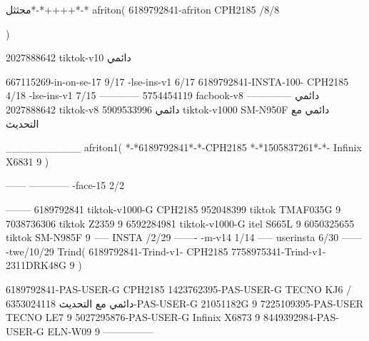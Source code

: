 مجثثل*-*++++*-*
afriton(
6189792841-afriton CPH2185  /8/8

)

2027888642 tiktok-v10
دائمي

667115269-in-on-se-17 9/17
-lse-ins-v1 6/17
6189792841-INSTA-100- CPH2185 4/18
-lse-ins-v1 7/15
------------
5754454119 facbook-v8
دائمي
--------------
2027888642 tiktok-v8
دائمي
5909533996 tiktok-v1000  SM-N950F
دائمي مع التحديث

__________
afriton1(
*-*6189792841*-*-CPH2185
*-*1505837261*-*-  Infinix X6831   9
)


------
------------
-face-15 2/2

--------
6189792841 tiktok-v1000-G CPH2185 
952048399 tiktok TMAF035G 9
7038736306 tiktok   Z2359  9
6592284981 tiktok-v1000-G  itel S665L  9
6050325655 tiktok  SM-N985F  9
-----
 INSTA /2/29
-------
-m-v14 1/14
-----
userinsta 6/30
------
-twe/10/29
Trind(
6189792841-Trind-v1- CPH2185 
7758975341-Trind-v1- 2311DRK48G  9
)


6189792841-PAS-USER-G CPH2185 
1423762395-PAS-USER-G TECNO KJ6  /دائمي مع التحديث
6353024118-PAS-USER-G   21051182G  9
7225109395-PAS-USER   TECNO LE7  9
5027295876-PAS-USER-G   Infinix X6873   9
8449392984-PAS-USER-G   ELN-W09   9
    ---------------
